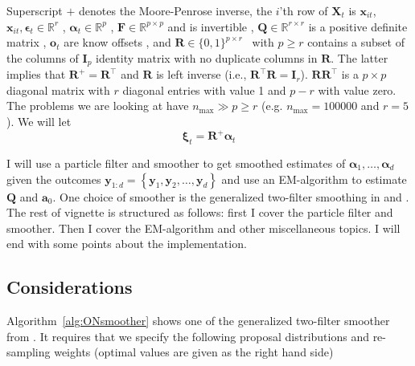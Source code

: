 \documentclass[notitlepage]{article}
\renewcommand{\vec}[1]{\bm{#1}}
\newcommand{\mat}[1]{\mathbf{#1}}
\newcommand{\Lbrace}[1]{\left\{ #1\right\}}
\newcommand{\dimState}{p}
\newcommand{\dimRng}{r}
\newcommand{\nPeriods}{d}
\newcommand{\nMax}{n_{\text{max}}}
\begin{document}
Superscript $+$ denotes the Moore-Penrose inverse, %
the $i$'th row of $\mat{X}_t$ is $\vec{x}_{it}$, $\vec{x}_{it},\vec{\epsilon}_t\in\mathbb{R}^\dimRng$%
, $\vec{\alpha}_t\vec\in\mathbb{R}^\dimState$%
, $\mat{F} \in \mathbb{R}^{\dimState\times\dimState}$ and is invertible%
, $\mat{Q} \in \mathbb{R}^{\dimRng\times\dimRng}$ is a positive definite matrix%
, $\vec{o}_t$ are know offsets%
, and $\mat{R} \in \{0,1\}^{\dimState\times \dimRng}$%
~with $\dimState\geq\dimRng$ contains a subset of the columns of $\mat{I}_{\dimState}$ identity matrix with no duplicate columns in $\mat{R}$. The latter implies that $\mat{R}^+ = \mat{R}^\top$ and $\mat{R}$ is left inverse (i.e., $\mat{R}^\top\mat{R} = \mat{I}_\dimRng$). $\mat{R}\mat{R}^\top$ is a $\dimState\times\dimState$ diagonal matrix with $\dimRng$ diagonal entries with value 1 and $\dimState - \dimRng$ with value zero. The problems we are looking at have $\nMax \gg \dimState \geq \dimRng$ (e.g. $\nMax = 100000$ and $\dimRng = 5$). We will let %
%
$$\vec{\xi}_{t} = \mat{R}^{+}\vec{\alpha}_t$$

I will use a particle filter and smoother to get smoothed estimates of $\vec{\alpha}_1, \dots, \vec{\alpha}_\nPeriods$ given the outcomes $\vec{y}_{1:\nPeriods} = \Lbrace{\vec{y}_1,\vec{y}_2,\dots, \vec{y}_\nPeriods}$ and use an EM-algorithm to estimate $\mat{Q}$ and $\vec{a}_0$. One choice of smoother is the generalized two-filter smoothing in \cite{fearnhead10} and \cite{briers09}. The rest of vignette is structured as follows: first I cover the particle filter and smoother. Then I cover the EM-algorithm and other miscellaneous topics. I will end with some points about the implementation.

\subsection*{Considerations}
Algorithm~\ref{alg:ONsmoother} shows one of the generalized two-filter smoother from \cite{fearnhead10}. It requires that we specify the following proposal distributions and re-sampling weights (optimal values are given as the right hand side)
\end{document}
